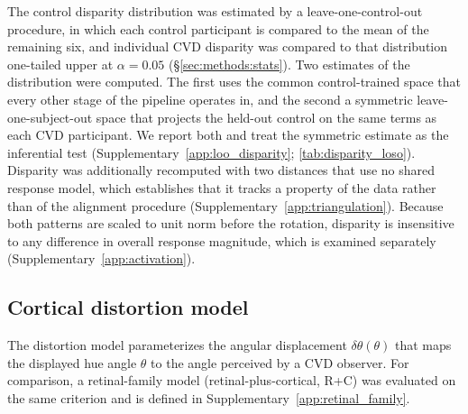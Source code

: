 The control disparity distribution was estimated by a leave-one-control-out procedure, in which each control participant is compared to the mean of the remaining six, and individual CVD disparity was compared to that distribution one-tailed upper at $\alpha = 0.05$ (\S\ref{sec:methods:stats}). Two estimates of the distribution were computed. The first uses the common control-trained space that every other stage of the pipeline operates in, and the second a symmetric leave-one-subject-out space that projects the held-out control on the same terms as each CVD participant. We report both and treat the symmetric estimate as the inferential test (Supplementary~\cref{app:loo_disparity}; \cref{tab:disparity_loso}). Disparity was additionally recomputed with two distances that use no shared response model, which establishes that it tracks a property of the data rather than of the alignment procedure (Supplementary~\cref{app:triangulation}).
 Because both patterns are scaled to unit norm before the rotation, disparity is insensitive to any difference in overall response magnitude, which is examined separately (Supplementary~\cref{app:activation}).

\subsection{Cortical distortion model}
\label{sec:methods:candidates}

The distortion model parameterizes the angular displacement $\delta\theta(\theta)$ that maps the displayed hue angle $\theta$ to the angle perceived by a CVD observer. For comparison, a retinal-family model (retinal-plus-cortical, R+C) was evaluated on the same criterion and is defined in Supplementary~\cref{app:retinal_family}.

